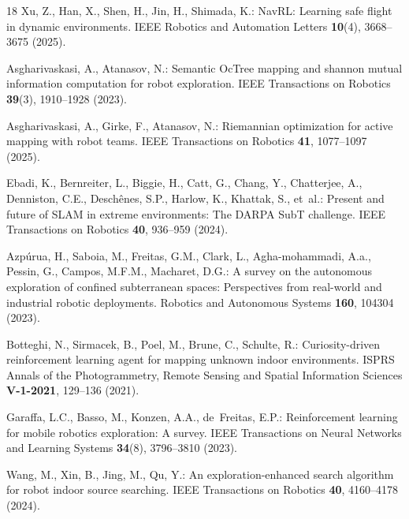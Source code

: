 \documentclass[runningheads]{llncs}
\begin{document}
\begin{thebibliography}{18}
Xu, Z., Han, X., Shen, H., Jin, H., Shimada, K.: {NavRL}: Learning safe flight
  in dynamic environments. IEEE Robotics and Automation Letters
  \textbf{10}(4),  3668--3675 (2025). 

Asgharivaskasi, A., Atanasov, N.: Semantic {OcTree} mapping and shannon mutual
  information computation for robot exploration. IEEE Transactions on Robotics
  \textbf{39}(3),  1910--1928 (2023). 

Asgharivaskasi, A., Girke, F., Atanasov, N.: {Riemannian} optimization for
  active mapping with robot teams. IEEE Transactions on Robotics  \textbf{41},
  1077--1097 (2025). 

Ebadi, K., Bernreiter, L., Biggie, H., Catt, G., Chang, Y., Chatterjee, A.,
  Denniston, C.E., Desch{\^e}nes, S.P., Harlow, K., Khattak, S., et~al.:
  Present and future of {SLAM} in extreme environments: The {DARPA} {SubT}
  challenge. IEEE Transactions on Robotics  \textbf{40},  936--959 (2024).

Azp{\'u}rua, H., Saboia, M., Freitas, G.M., Clark, L., Agha-mohammadi, A.a.,
  Pessin, G., Campos, M.F.M., Macharet, D.G.: A survey on the autonomous
  exploration of confined subterranean spaces: Perspectives from real-world and
  industrial robotic deployments. Robotics and Autonomous Systems
  \textbf{160},  104304 (2023). 

Botteghi, N., Sirmacek, B., Poel, M., Brune, C., Schulte, R.: Curiosity-driven
  reinforcement learning agent for mapping unknown indoor environments. ISPRS
  Annals of the Photogrammetry, Remote Sensing and Spatial Information Sciences
   \textbf{V-1-2021},  129--136 (2021).

Garaffa, L.C., Basso, M., Konzen, A.A., de~Freitas, E.P.: Reinforcement
  learning for mobile robotics exploration: A survey. IEEE Transactions on
  Neural Networks and Learning Systems  \textbf{34}(8),  3796--3810 (2023).

Wang, M., Xin, B., Jing, M., Qu, Y.: An exploration-enhanced search algorithm
  for robot indoor source searching. IEEE Transactions on Robotics
  \textbf{40},  4160--4178 (2024). 


\end{thebibliography}
\end{document}
